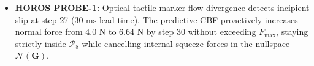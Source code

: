 \begin{itemize}
\begin{itemize}
        \item This demonstrates that while fixed margins suffice for stationary friction, no fixed scalar margin $k_{\text{margin}}$ can simultaneously satisfy anti-slip and anti-crush constraints under abrupt nonstationary lubrication transitions. Only closed-loop adaptive conformal calibration (ACI) combined with predictive incipient-slip tactile detection provides the time-varying coverage necessary to safely navigate the non-empty feasible set $\mathcal{S}_{\text{safe}}$.
    \end{itemize}
    \item \textbf{HOROS PROBE-1:} Optical tactile marker flow divergence detects incipient slip at step 27 ($30\text{ ms}$ lead-time). The predictive CBF proactively increases normal force from $4.0\text{ N}$ to $6.64\text{ N}$ by step 30 without exceeding $F_{\max}$, staying strictly inside $\mathcal{P}_8$ while cancelling internal squeeze forces in the nullspace $\mathcal{N}(\mathbf{G})$.
\end{itemize}

